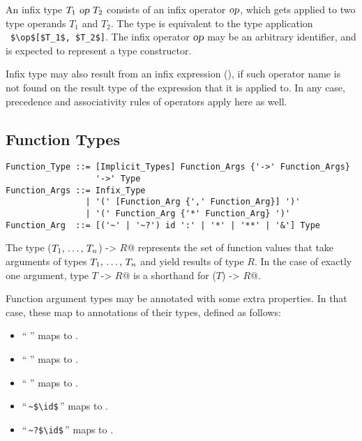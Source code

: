 An infix type $T_1\ \mbox{\sl op}\ T_2$ consists of an infix operator $\mbox{\sl op}$, which gets applied to two type operands $T_1$ and $T_2$. The type is equivalent to the type application ~\lstinline!$\op$[$T_1$, $T_2$]!. The infix operator $\mbox{\sl op}$ may be an arbitrary identifier, and is expected to represent a type constructor. 

Infix type may also result from an infix expression (), if such operator name is not found on the result type of the expression that it is applied to. In any case, precedence and associativity rules of operators apply here as well. 





\subsection{Function Types}
\label{sec:function-types}

\syntax\begin{lstlisting}
Function_Type ::= [Implicit_Types] Function_Args {'->' Function_Args}
                  '->' Type
Function_Args ::= Infix_Type
                | '(' [Function_Arg {',' Function_Arg}] ')'
                | '(' Function_Arg {'*' Function_Arg} ')'
Function_Arg  ::= [('~' | '~?') id ':' | '*' | '**' | '&'] Type
\end{lstlisting}

The type \lstinline@($T_1 ,\, \ldots ,\, T_n$) -> $R$@ represents the set of function values that take arguments of types $T_1 ,\, \ldots ,\, T_n$ and yield results of type $R$. In the case of exactly one argument, type \lstinline@$T$ -> $R$@ is a shorthand for \lstinline@($T$) -> $R$@. 

Function argument types may be annotated with some extra properties. In that case, these map to annotations of their types, defined as follows:
\begin{itemize}
\item ``\,\code{*}\,'' maps to . 
\item ``\,\code{**}\,'' maps to . 
\item ``\,\code{&}\,'' maps to . 
\item ``\,\lstinline!~$\id$!\,'' maps to . 
\item ``\,\lstinline!~?$\id$!\,'' maps to . 
\end{itemize}

